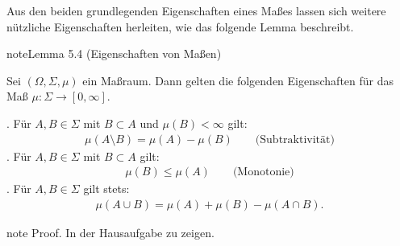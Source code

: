 \documentclass[letterpaper,10pt,german]{jupyterBook}
\begin{document}
\sphinxAtStartPar
Aus den beiden grundlegenden Eigenschaften eines Maßes lassen sich weitere nützliche Eigenschaften herleiten, wie das folgende Lemma beschreibt.
\label{masstheorie/masstheorie:lemma-11}
\begin{sphinxadmonition}{note}{Lemma 5.4 (Eigenschaften von Maßen)}



\sphinxAtStartPar
Sei \((\Omega, \Sigma, \mu)\) ein Maßraum.
Dann gelten die folgenden Eigenschaften für das Maß \(\mu \colon \Sigma \rightarrow [0,\infty]\).

. Für \(A,B \in \Sigma\) mit \(B \subset A\) und \(\mu(B) < \infty\) gilt:
\begin{equation*}
\begin{split}\mu(A \setminus B) = \mu(A) - \mu(B) \qquad \text{(Subtraktivität)}\end{split}
\end{equation*}
. Für \(A,B \in \Sigma\) mit \(B \subset A\) gilt:
\begin{equation*}
\begin{split}\mu(B) \leq \mu(A) \qquad \text{(Monotonie)}\end{split}
\end{equation*}
. Für \(A,B \in \Sigma\) gilt stets:
\begin{equation*}
\begin{split}\mu(A \cup B) = \mu(A) + \mu(B) - \mu(A \cap B).\end{split}
\end{equation*}\end{sphinxadmonition}

\begin{sphinxadmonition}{note}
\sphinxAtStartPar
Proof. In der Hausaufgabe zu zeigen.
\end{sphinxadmonition}
\end{document}
